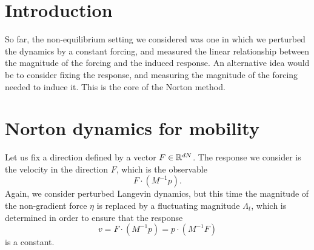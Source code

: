 \section{Introduction}
So far, the non-equilibrium setting we considered was one in which we perturbed the dynamics by a constant forcing,
 and measured the linear relationship between the magnitude of the forcing and the induced response.
An alternative idea would be to consider fixing the response, and measuring the magnitude of the forcing needed to induce it. This is the core of the Norton method.


\section{Norton dynamics for mobility}
Let us fix a direction defined by a vector $F\in \mathbb{R}^{dN}$. The response we consider is the velocity in the direction $F$, which is the observable \[F\cdot \left(M^{-1} p\right).\]
Again, we consider perturbed Langevin dynamics, but this time the magnitude of the non-gradient force $\eta$ is replaced by a fluctuating magnitude $\Lambda_t$, which is determined in order to ensure that the response
\[v=F\cdot\left(M^{-1}p\right)=p\cdot\left(M^{-1}F\right)\]
is a constant.

